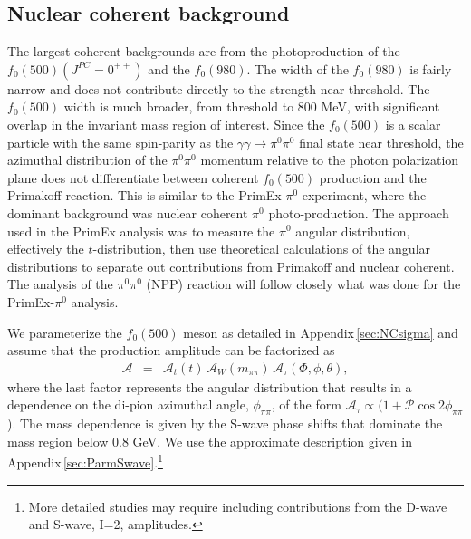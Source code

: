 \subsection{Nuclear coherent background \label{sec:NCback}}
   
The largest coherent backgrounds are  
from the photoproduction of the $f_0(500)(J^{PC}=0^{++})$ and the $f_0(980)$.
The width of the
$f_0(980)$ is fairly narrow and does not contribute directly to the strength
near threshold.
The $f_0(500)$ width is much
broader, from threshold to 800 MeV, with significant overlap in the
invariant mass region of interest.  Since the $f_0(500)$ is a scalar
particle with the same spin-parity as the $\gamma \gamma \rightarrow
\pi^0\pi^0$ final state near threshold, the azimuthal distribution of the
$\pi^0\pi^0$ momentum relative to the
photon polarization plane does not differentiate between coherent
$f_0(500)$ production and the Primakoff reaction.  
This is similar to the PrimEx-$\pi^0$ experiment, where the dominant background
was
nuclear coherent $\pi^0$ photo-production.  The approach used in the
PrimEx analysis was to measure the $\pi^0$ angular distribution,
effectively the $t$-distribution, then use theoretical calculations of
the angular distributions to separate out contributions from Primakoff
and nuclear coherent. The analysis of the $\pi^0\pi^0$ (NPP) reaction
will follow closely what was done for the PrimEx-$\pi^0$
analysis.  

We parameterize the $f_{0}(500)$ meson as detailed in
Appendix\,\ref{sec:NCsigma} and assume that the production amplitude
can be factorized as
\begin{eqnarray}
\mathcal{A} & = & \mathcal{A}_t(t) \, \mathcal{A}_W(m_{\pi\pi}) \, \mathcal{A}_\tau(\Phi, \phi, \theta),
\end{eqnarray}
where the last factor represents the angular distribution that results
in a dependence on the di-pion azimuthal angle, $\phi_{\pi\pi}$, of
the form $\mathcal{A}_\tau \propto (1 + \mathcal{P}
\cos{2\phi_{\pi\pi}}$).  The mass dependence is given by the S-wave
phase shifts that dominate the mass region below 0.8 GeV. We use the
approximate description given in
Appendix\,\ref{sec:ParmSwave}.\footnote{More detailed studies may
  require including contributions from the D-wave and S-wave, I=2,
  amplitudes.}

